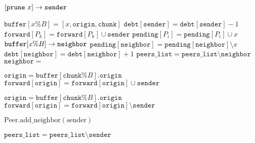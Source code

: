 \documentclass{article}
\begin{document}
\begin{algorithmic}
  \State $[\mathtt{prune}~x] \rightarrow \mathtt{sender}$
  \EndProcedure  
\end{algorithmic}

\begin{algorithmic}
  \State $\mathtt{buffer}[x \% B] = [x,\mathtt{origin},\mathtt{chunk}]$
  \State $\mathtt{debt}[\mathtt{sender}] = \mathtt{debt}[\mathtt{sender}]-1$
  \State $\mathtt{forward}[P_k] = \mathtt{forward}[P_k] \cup \mathtt{sender}$
  \EndIf
  \State $\mathtt{pending}[P_i] = \mathtt{pending}[P_i] \cup x$
  \EndFor
  \State $\mathtt{buffer}[x\% B] \rightarrow \mathtt{neighbor}$
  \State $\mathtt{pending}[\mathtt{neighbor}] = \mathtt{pending}[\mathtt{neighbor}] \setminus x$
  \State $\mathtt{debt}[\mathtt{neighbor}]=\mathtt{debt}[\mathtt{neighbor}]+1$
  \State $\mathtt{peers\_list} = \mathtt{peers\_list}\setminus \mathtt{neighbor}$
  \EndFor
  \EndIf
  \EndFor
  \State $\mathtt{neighbor} =$ 
  \EndProcedure  
\end{algorithmic}

\begin{algorithmic}

  \State $\mathtt{origin}=\mathtt{buffer}[\mathtt{chunk}\% B].\mathtt{origin}$
  \State $\mathtt{forward}[\mathtt{origin}] = \mathtt{forward}[\mathtt{origin}] \cup \mathtt{sender}$
  \EndIf

  \State $\mathtt{origin}=\mathtt{buffer}[\mathtt{chunk}\% B].\mathtt{origin}$
  \State$\mathtt{forward}[\mathtt{origin}] = \mathtt{forward}[\mathtt{origin}] \setminus \mathtt{sender}$
  \EndIf
  
  \State $\mathrm{Peer}.\mathrm{add\_neighbor}(\mathrm{sender})$
  \EndIf
  
  \State $\mathtt{peers\_list} = \mathtt{peers\_list}\setminus \mathtt{sender}$
  \EndFor
  \EndIf
  
  \EndProcedure  
\end{algorithmic}
\end{document}
